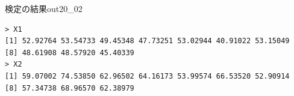 \begin{Rscreen}{検定の結果}{out20_02}
	\begin{verbatim}
> X1
[1] 52.92764 53.54733 49.45348 47.73251 53.02944 40.91022 53.15049 
[8] 48.61908 48.57920 45.40339
> X2
[1] 59.07002 74.53850 62.96502 64.16173 53.99574 66.53520 52.90914 
[8] 57.34738 68.96570 62.38979
\end{verbatim}
\end{Rscreen}
